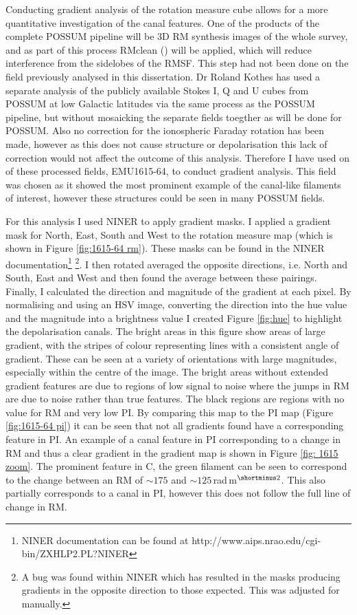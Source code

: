 Conducting gradient analysis of the rotation measure cube allows for a more quantitative investigation of the canal features. One of the products of the complete POSSUM pipeline will be 3D RM synthesis images of the whole survey, and as part of this process RMclean (\cite{Heald_2009}) will be applied, which will reduce interference from the sidelobes of the RMSF. This step had not been done on the field previously analysed in this dissertation. Dr Roland Kothes has used a separate analysis of the publicly available Stokes I, Q and U cubes from POSSUM at low Galactic latitudes via the same process as the POSSUM pipeline, but without mosaicking the separate fields toegther as will be done for POSSUM. Also no correction for the ionospheric Faraday rotation has been made, however as this does not cause structure or depolarisation this lack of correction would not affect the outcome of this analysis. Therefore I have used on of these processed fields, EMU1615-64, to conduct gradient analysis. This field was chosen as it showed the most prominent example of the canal-like filaments of interest, however these structures could be seen in many POSSUM fields.

For this analysis I used NINER to apply gradient masks. I applied a gradient mask for North, East, South and West to the rotation measure map (which is shown in Figure \ref{fig:1615-64 rm}). These masks can be found in the NINER documentation\footnote{NINER documentation can be found at http://www.aips.nrao.edu/cgi-bin/ZXHLP2.PL?NINER} \footnote{A bug was found within NINER which has resulted in the masks producing gradients in the opposite direction to those expected. This was adjusted for manually.}. I then rotated averaged the opposite directions, i.e. North and South, East and West and then found the average between these pairings. Finally, I calculated the direction and magnitude of the gradient at each pixel. By normalising and using an HSV image, converting the direction into the hue value and the magnitude into a brightness value I created Figure \ref{fig:hue} to highlight the depolarisation canals. The bright areas in this figure show areas of large gradient, with the stripes of colour representing lines with a consistent angle of gradient. These can be seen at a variety of orientations with large magnitudes, especially within the centre of the image. The bright areas without extended gradient features are due to regions of low signal to noise where the jumps in RM are due to noise rather than true features. The black regions are regions with no value for RM and very low PI. By comparing this map to the PI map (Figure \ref{fig:1615-64 pi}) it can be seen that not all gradients found have a corresponding feature in PI. An example of a canal feature in PI corresponding to a change in RM and thus a clear gradient in the gradient map is shown in Figure \ref{fig: 1615 zoom}. The prominent feature in C, the green filament can be seen to correspond to the change between an RM of $\sim 175$ and $\sim 125\,$rad$\,$m$^{\shortminus2}$. This also partially corresponds to a canal in PI, however this does not follow the full line of change in RM.

